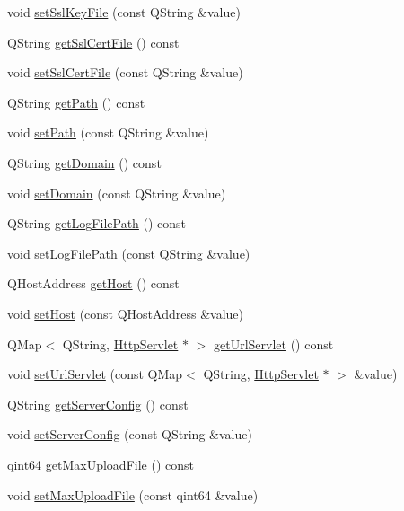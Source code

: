\begin{DoxyCompactItemize}
\item 
void \hyperlink{class_c_w_f_1_1_configuration_a248d424dd8e3f60fc8d8bdeb32a16c9f}{set\+Ssl\+Key\+File} (const Q\+String \&value)
\item 
Q\+String \hyperlink{class_c_w_f_1_1_configuration_a42b4b216207c32f46013b23b09358f21}{get\+Ssl\+Cert\+File} () const 
\item 
void \hyperlink{class_c_w_f_1_1_configuration_a7a531400c3b9797afc2665576d19c69f}{set\+Ssl\+Cert\+File} (const Q\+String \&value)
\item 
Q\+String \hyperlink{class_c_w_f_1_1_configuration_ab06608c19c21328164decd638184e1d7}{get\+Path} () const 
\item 
void \hyperlink{class_c_w_f_1_1_configuration_ac41976f9d3fb9232a91f81f1eb683b89}{set\+Path} (const Q\+String \&value)
\item 
Q\+String \hyperlink{class_c_w_f_1_1_configuration_ad49757d6459a0082b6330eaf3e3915e7}{get\+Domain} () const 
\item 
void \hyperlink{class_c_w_f_1_1_configuration_a6aea4b5ebe457e8a9f29d4c81912dd62}{set\+Domain} (const Q\+String \&value)
\item 
Q\+String \hyperlink{class_c_w_f_1_1_configuration_a5b9a98b8265c26b158a220ae5bdc13c6}{get\+Log\+File\+Path} () const 
\item 
void \hyperlink{class_c_w_f_1_1_configuration_a66344b5f402647dd7894295c1699afdf}{set\+Log\+File\+Path} (const Q\+String \&value)
\item 
Q\+Host\+Address \hyperlink{class_c_w_f_1_1_configuration_a4d229f83310649ddd7329a03505e8488}{get\+Host} () const 
\item 
void \hyperlink{class_c_w_f_1_1_configuration_a5e7e38798ec8de6e6d5507e6eed5672c}{set\+Host} (const Q\+Host\+Address \&value)
\item 
Q\+Map$<$ Q\+String, \hyperlink{class_c_w_f_1_1_http_servlet}{Http\+Servlet} $\ast$ $>$ \hyperlink{class_c_w_f_1_1_configuration_a7e30802cbc649ade0c815954f29b789b}{get\+Url\+Servlet} () const 
\item 
void \hyperlink{class_c_w_f_1_1_configuration_a693432575a56f614d130347d59226dd6}{set\+Url\+Servlet} (const Q\+Map$<$ Q\+String, \hyperlink{class_c_w_f_1_1_http_servlet}{Http\+Servlet} $\ast$ $>$ \&value)
\item 
Q\+String \hyperlink{class_c_w_f_1_1_configuration_a9601c4f284e965e151141a3bc56ffc43}{get\+Server\+Config} () const 
\item 
void \hyperlink{class_c_w_f_1_1_configuration_a50e4f818e9020e8e97bb7cfdce60d187}{set\+Server\+Config} (const Q\+String \&value)
\item 
qint64 \hyperlink{class_c_w_f_1_1_configuration_ab984199080d67569ee9a75b7bab3d546}{get\+Max\+Upload\+File} () const 
\item 
void \hyperlink{class_c_w_f_1_1_configuration_a5426d15635fb22763e0d7807de49923c}{set\+Max\+Upload\+File} (const qint64 \&value)
\end{DoxyCompactItemize}
